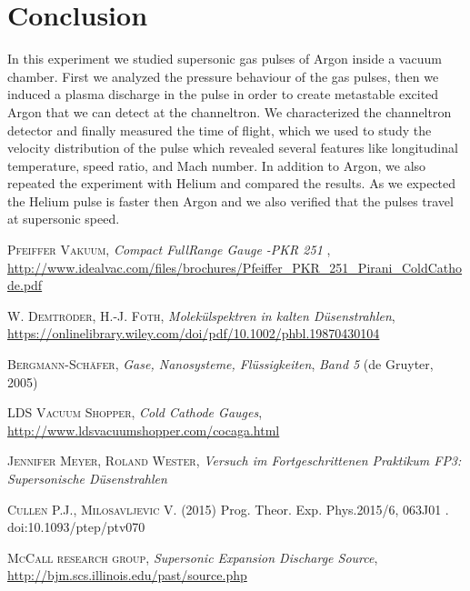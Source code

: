 \documentclass[a4paper,10pt]{article}
\begin{document}
\section{Conclusion}
In this experiment we studied supersonic gas pulses of Argon inside a vacuum chamber. First we analyzed the pressure behaviour of the gas pulses, then we induced a plasma discharge in the pulse in order to create metastable excited Argon that we can detect at the channeltron. We characterized the channeltron detector and finally measured the time of flight, which we used to study the velocity distribution of the pulse which revealed several features like longitudinal temperature, speed ratio, and Mach number. In addition to Argon, we also repeated the experiment with Helium and compared the results. As we expected the Helium pulse is faster then Argon and we also verified that the pulses travel at supersonic speed.  

\begin{thebibliography}{99}
\textsc{Pfeiffer Vakuum}, \textit{Compact FullRange Gauge -PKR 251 }, \url{http://www.idealvac.com/files/brochures/Pfeiffer_PKR_251_Pirani_ColdCathode.pdf}

\textsc{W. Demtröder, H.-J. Foth}, \textit{Molekülspektren in kalten Düsenstrahlen}, \url{https://onlinelibrary.wiley.com/doi/pdf/10.1002/phbl.19870430104}

\textsc{Bergmann-Schäfer}, \textit{Gase, Nanosysteme, Flüssigkeiten}, \textit{Band 5} (de Gruyter, 2005)

\textsc{LDS Vacuum Shopper}, \textit{Cold Cathode Gauges}, \url{http://www.ldsvacuumshopper.com/cocaga.html}

\textsc{Jennifer Meyer, Roland Wester}, \textit{Versuch im Fortgeschrittenen Praktikum FP3: Supersonische Düsenstrahlen}

\textsc{Cullen P.J., Milosavljevic V.} (2015) Prog. Theor. Exp. Phys.2015/6, 063J01 . doi:10.1093/ptep/ptv070

\textsc{McCall research group}, \textit{Supersonic Expansion Discharge Source}, \url{http://bjm.scs.illinois.edu/past/source.php}
\end{thebibliography}
\end{document}
